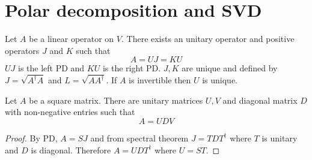 \section{Polar decomposition and SVD}
\begin{theorem}
    Let \(A\) be a linear operator on \(V\). There exists an unitary operator and positive operators \(J\) and \(K\) such that 
    \begin{equation*}
        A = UJ = KU
    \end{equation*}
    \(UJ\) is the left PD and \(KU\) is the right PD. \(J,K\) are unique and defined by \(J = \sqrt{A^{\dagger }A}\) and \(L = \sqrt{AA^{\dagger}}\). If \(A\) is invertible then \(U\) is unique. 
\end{theorem}

\begin{theorem}
    Let \(A\) be a square matrix. There are unitary matrices \(U,V\) and diagonal matrix \(D\) with non-negative entries such that 
    \begin{equation*}
        A = UDV
    \end{equation*}
\end{theorem}
\begin{proof}
    By PD, \(A = SJ\) and from spectral theorem \(J = TDT^{\dagger}\) where \(T\) is unitary and \(D\) is diagonal. Therefore \(A = U D T^{\dagger}\) where \(U = ST\).
\end{proof}
